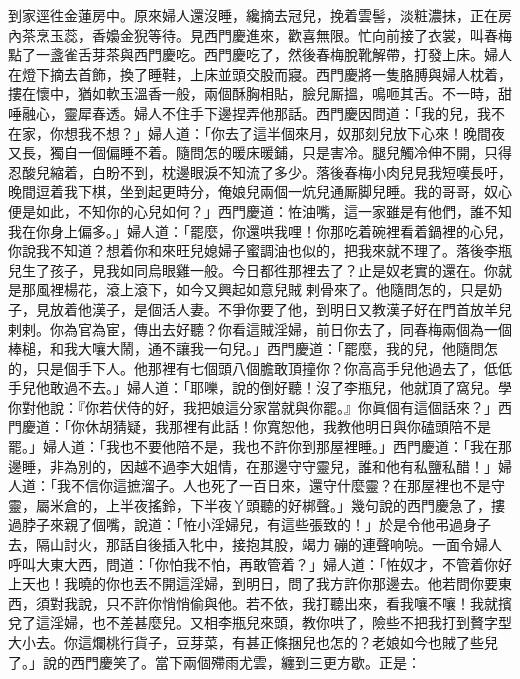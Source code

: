 到家逕徃金蓮房中。原來婦人還沒睡，纔摘去冠兒，挽着雲髻，淡粧濃抹，正在房內茶烹玉蕊，香嬝金猊等待。見西門慶進來，歡喜無限。忙向前接了衣裳，叫春梅點了一盞雀舌芽茶與西門慶吃。西門慶吃了，然後春梅脫靴解帶，打發上床。婦人在燈下摘去首飾，換了睡鞋，上床並頭交股而寢。西門慶將一隻胳膊與婦人枕着，摟在懷中，猶如軟玉溫香一般，兩個酥胸相貼，臉兒厮搵，鳴咂其舌。不一時，甜唾融心，靈犀春透。婦人不住手下邊捏弄他那話。西門慶因問道：「我的兒，我不在家，你想我不想？」婦人道：「你去了這半個來月，奴那刻兒放下心來！晚間夜又長，獨自一個偏睡不着。隨問怎的暖床暖鋪，只是害冷。{}{}腿兒觸冷伸不開，只得忍酸兒縮着，白盼不到，枕邊眼淚不知流了多少。落後春梅小肉兒見我短嘆長吁，晚間逗着我下棋，坐到起更時分，俺娘兒兩個一炕兒通厮脚兒睡。我的哥哥，奴心便是如此，不知你的心兒如何？」西門慶道：恠油嘴，這一家雖是有他們，誰不知我在你身上偏多。」{}婦人道：「罷麼，你還哄我哩！你那吃着碗裡看着鍋裡的心兒，你說我不知道？想着你和來旺兒媳婦子蜜調油也似的，把我來就不理了。落後李瓶兒生了孩子，見我如同烏眼雞一般。今日都徃那裡去了？止是奴老實的還在。{}你就是那風裡楊花，滾上滾下，如今又興起如意兒賊𢱉剌骨來了。他隨問怎的，只是奶子，見放着他漢子，是個活人妻。不爭你要了他，到明日又教漢子好在門首放羊兒剌剌。你為官為宦，傳出去好聽？你看這賊淫婦，前日你去了，同春梅兩個為一個棒槌，和我大嚷大鬧，通不讓我一句兒。」西門慶道：「罷麼，我的兒，他隨問怎的，只是個手下人。他那裡有七個頭八個膽敢頂撞你？你高高手兒他過去了，低低手兒他敢過不去。」{}婦人道：「耶嚛，說的倒好聽！沒了李瓶兒，他就頂了窩兒。學你對他說：『你若伏侍的好，我把娘這分家當就與你罷。』你眞個有這個話來？」{}西門慶道：「你休胡猜疑，我那裡有此話！你寬恕他，我教他明日與你磕頭陪不是罷。」婦人道：「我也不要他陪不是，我也不許你到那屋裡睡。」西門慶道：「我在那邊睡，非為別的，因越不過李大姐情，在那邊守守靈兒，誰和他有私鹽私醋！」婦人道：「我不信你這摭溜子。人也死了一百日來，還守什麼靈？在那屋裡也不是守靈，屬米倉的，上半夜搖鈴，下半夜丫頭聽的好梆聲。」幾句說的西門慶急了，摟過脖子來親了個嘴，說道：「恠小淫婦兒，有這些張致的！」於是令他弔過身子去，隔山討火，那話自後插入牝中，接抱其股，竭力𢵞磞的連聲响喨。一面令婦人呼叫大東大西，問道：「你怕我不怕，再敢管着？」婦人道：「恠奴才，不管着你好上天也！我曉的你也丟不開這淫婦，到明日，問了我方許你那邊去。他若問你要東西，須對我說，只不許你悄悄偷與他。若不依，我打聽出來，看我嚷不嚷！我就擯兌了這淫婦，也不差甚麼兒。又相李瓶兒來頭，教你哄了，險些不把我打到贅字型大小去。{}你這爛桃行貨子，豆芽菜，有甚正條捆兒也怎的？老娘如今也賊了些兒了。」{}說的西門慶笑了。當下兩個殢雨尤雲，纏到三更方歇。正是：

